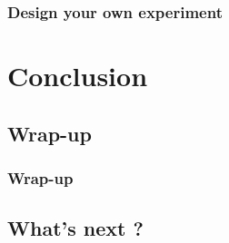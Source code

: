 \documentclass[xcolor=dvipsnames,english]{beamer}
\begin{document}
\begin{frame}
  \frametitle{Design your own experiment}
\end{frame}


\section{Conclusion}
\subsection{Wrap-up}

\begin{frame}
  \frametitle{Wrap-up}
\end{frame}

\subsection{What's next ?}
\end{document}
